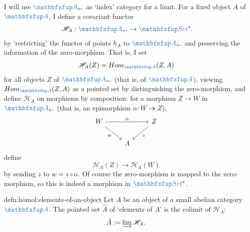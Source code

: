 I will use $\categ{A}_{\leftarrow}$ as `index' category for a limit.
For a fixed object $A$ of $\categ{A}$, I define a covariant functor
\[
  \mathscr{H}_A : \categ{A}_{\leftarrow} \to \categ{Set}^*
\]
by `restricting' the functor of points $h_A$ to
$\categ{A}_{\leftarrow}$ and preserving the information of the
zero-morphism. That is, I set
\[
  \mathscr{H}_A(Z) = \Hom_{\categ{A}}(Z,A)
\]
for all objects $Z$ of $\categ{A}_{\leftarrow}$ (that is, of
$\categ{A}$), viewing $\Hom_{\categ{A}}(Z,A)$ as a pointed set by
distinguishing the zero-morphism, and define $\mathscr{H}_A$ on
morphisms by composition: for a morphism $Z \to W$ in
$\categ{A}_{\leftarrow}$ (that is, an epimorphism
$\alpha : W \twoheadrightarrow Z$),
\[\begin{tikzcd}
    W \arrow[rr, "\alpha"] \arrow[dr, "w"'] & & Z \arrow[dl, "z"] \\
    & A &
  \end{tikzcd}\] define
\[
  \mathscr{H}_A(Z) \to \mathscr{H}_A(W)
\]
by sending $z$ to $w = z \circ \alpha$. Of course the zero-morphism is
mapped to the zero-morphism, so this is indeed a morphism in
$\categ{Set}^*$.
\begin{defn}{}{defn:homol:elements-of-an-object}
  Let $A$ be an object of a small abelian category $\categ{A}$. The
  pointed set $\hat{A}$ of `elements of $A$' is the colimit of
  $\mathscr{H}_A$:
  \[
    \hat{A} := \varinjlim \mathscr{H}_A.
  \]
\end{defn}

